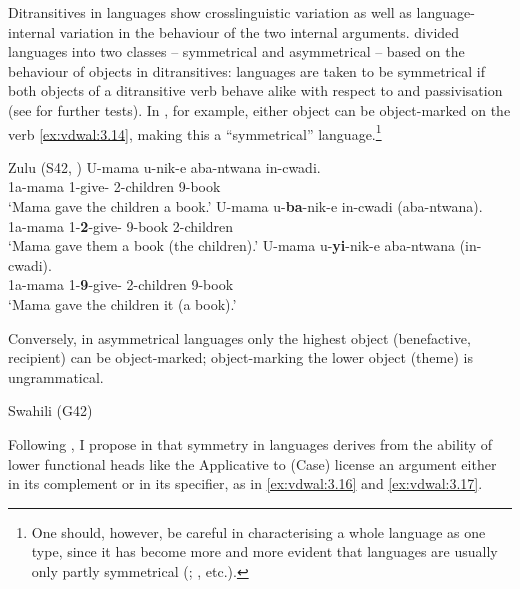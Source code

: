 \documentclass[output=paper]{langsci/langscibook}
\begin{document}
Ditransitives in  languages show crosslinguistic variation as well as
lan\-guage-internal variation in the behaviour of the two internal arguments.
\citet{BresMosh1990} divided  languages into two classes -- symmetrical
and asymmetrical -- based on the behaviour of objects in ditransitives:
languages are taken to be symmetrical if both objects of a ditransitive
verb
behave alike with respect to  and passivisation (see
\citealt{Ngonyani1996,Buell2005} for further tests). In , for
example, either object can be object-marked on the verb \eqref{ex:vdwal:3.14},
making this a \enquote{symmetrical} language.\footnote{One should, however, be careful
    in characterising a whole language as one type, since it has become more
    and more evident that languages are usually only partly symmetrical
    (\citealt{Schadeberg1995,Rugemalira1991,Thwala2006,Ngonyani1996,NgonyaniGithinji2006,Riedel2009,Baker1988,AlsinaMchombo1993,Simango1995,ZellerNgoboka2006,Jerro2015};
\citealt{vanderWal2017}, etc.).}

\ea\label{ex:vdwal:3.14}Zulu (S42, \citealt[11]{Adams2010})
	\ea
	\gll	 U-mama  u-nik-e  aba-ntwana   in-cwadi.\\
	    1a-mama  1\Sm{}{}-give-\Pfv{}  2-children  9-book\\
	\glt    ‘Mama gave the children a book.’
	\ex
	\gll	 U-mama  u-\textbf{ba}{}-nik-e  in-cwadi  (aba-ntwana).\\
	    1a-mama  1\Sm{}{}-\textbf{2\Om{}}-give-\Pfv{}  9-book  2-children\\
	\glt    ‘Mama gave them a book (the children).’
	\ex
    \gll U-mama  u-\textbf{yi}{}-nik-e  aba-ntwana   (in-cwadi).\\
    1a-mama  1\Sm{}{}-\textbf{9\Om{}}-give-\Pfv{}  2-children  9-book\\
    \glt ‘Mama gave the children it (a book).’
    \z
\z

Conversely, in asymmetrical languages only the highest object (benefactive,
recipient) can be object-marked; object-marking the lower object (theme) is
ungrammatical.

\ea\label{ex:vdwal:3.15} Swahili (G42)
    \z
\z

Following \textcite{HaddicanHolmberg2012,HaddicanHolmberg2015}, I propose in
\textcite{vanderWal2017} that symmetry in  languages derives from the
ability of lower functional heads like the Applicative to (Case) license an
argument either in its complement or in its specifier, as in \eqref{ex:vdwal:3.16}
and \eqref{ex:vdwal:3.17}.
\end{document}

